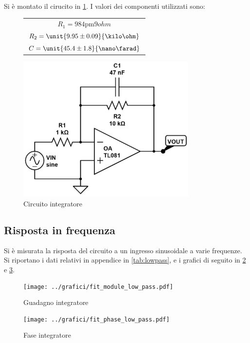 \documentclass[10pt,a4paper]{article}
\begin{document}
Si è montato il cirucito in \figurename{\ref{integratore}}. I valori dei componenti utilizzati sono:
\begin{figure}[H]
\begin{minipage}{0.49\textwidth}
\centering
\begin{tabular}{c}
$R_1 = \unit{984 \pm 9}{ohm}$	\\	$R_2 = \unit{9.95 \pm 0.09}{\kilo\ohm}$	\\	$C = \unit{45.4 \pm 1.8}{\nano\farad}$
\end{tabular}
\end{minipage}
\begin{minipage}{0.49\textwidth}
	\centering
	\includegraphics[width=0.8\textwidth]{../grafici/integratore_circuito.jpg}
	\caption{Circuito integratore}
	\label{integratore}
\end{minipage}
\end{figure}


\subsection{Risposta in frequenza}
Si è misurata la risposta del circuito a un ingresso sinusoidale a varie frequenze. Si riportano i dati relativi in appendice in \tablename{\ref{tab:lowpass}}, e i grafici di seguito in \figurename{\ref{fig:lowamp}} e \figurename{\ref{fig:lowph}}.
	\begin{figure}[H]
		\centering
		\texttt{[image: ../grafici/fit\_module\_low\_pass.pdf]}
		\caption{Guadagno integratore}
		\label{fig:lowamp}
	\end{figure}
	\begin{figure}[H]
		\centering
		\texttt{[image: ../grafici/fit\_phase\_low\_pass.pdf]}
		\caption{Fase integratore}
		\label{fig:lowph}
	\end{figure}
\end{document}
